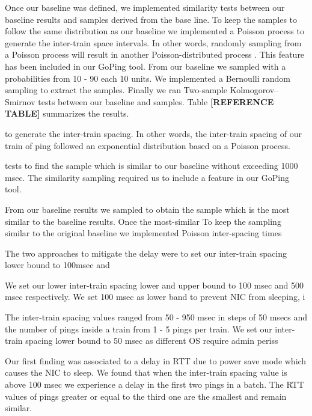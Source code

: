Once our baseline was defined, we implemented similarity tests between our baseline results and samples derived from the base line. To keep the samples to follow the same distribution as our baseline we implemented a Poisson process to generate the inter-train space intervals. In other words, randomly sampling from a Poisson process will result in another Poisson-distributed process \cite{raikov_decomposition}. This feature has been included in our GoPing tool. From our baseline we sampled with a probabilities from 10 - 90 each 10 units. We implemented a Bernoulli random sampling to extract the samples. Finally we ran Two-sample Kolmogorov–Smirnov tests between our baseline and samples. Table \textbf{[REFERENCE TABLE]} summarizes the results.





 to generate the inter-train spacing. In other words, the inter-train spacing of our train of ping followed an exponential distribution based on a Poisson process. 

 tests to find the sample which is similar to our baseline without exceeding 1000 msec.  The similarity sampling required us to include a feature in our GoPing tool. 



From our baseline results we sampled to obtain the sample which is the most similar to the baseline results. Once the most-similar  To keep the sampling similar to the original baseline we implemented Poisson inter-spacing times 






The two approaches to mitigate the delay were to set our inter-train spacing lower bound to 100msec and 



We set our lower inter-train spacing lower and upper bound to 100 msec and 500 msec respectively. We set 100 msec as lower band to prevent NIC from sleeping, i



The inter-train spacing values ranged from 50 - 950 msec in steps of 50 msecs and the number of pings inside a train from 1 - 5 pings per train. We set our inter-train spacing lower bound to 50 msec as different OS require admin periss



Our first finding was associated to a delay in RTT due to power save mode which causes the NIC to sleep. We found that when the inter-train spacing value is above 100 msec we experience a delay in the first two pings in a batch. The RTT values of pings greater or equal to the third one are the smallest and remain similar. 


